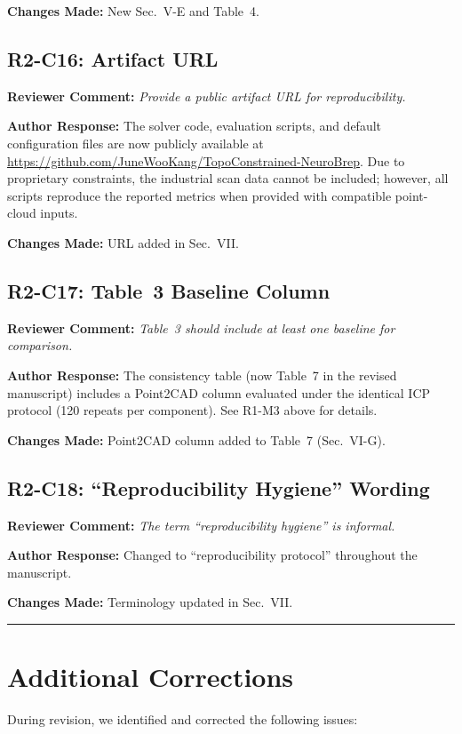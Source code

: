 \documentclass[11pt]{article}
\newcommand{\RC}[1]{\noindent\textcolor{revcolor}{\textbf{Reviewer Comment:} \emph{#1}}\par\medskip}
\newcommand{\AR}[1]{\noindent\textcolor{respcolor}{\textbf{Author Response:} #1}\par\medskip}
\newcommand{\CH}[1]{\noindent\textbf{Changes Made:} #1\par\bigskip}
\begin{document}
\CH{New Sec.~V-E and Table~4.}

\subsection*{R2-C16: Artifact URL}

\RC{Provide a public artifact URL for reproducibility.}

\AR{The solver code, evaluation scripts, and default configuration
files are now publicly available at
\url{https://github.com/JuneWooKang/TopoConstrained-NeuroBrep}.
Due to proprietary constraints, the industrial scan data cannot
be included; however, all scripts reproduce the reported metrics
when provided with compatible point-cloud inputs.}

\CH{URL added in Sec.~VII.}

\subsection*{R2-C17: Table~3 Baseline Column}

\RC{Table~3 should include at least one baseline for comparison.}

\AR{The consistency table (now Table~7 in the revised manuscript)
includes a Point2CAD column evaluated under the identical ICP
protocol (120 repeats per component).
See R1-M3 above for details.}

\CH{Point2CAD column added to Table~7 (Sec.~VI-G).}

\subsection*{R2-C18: ``Reproducibility Hygiene'' Wording}

\RC{The term ``reproducibility hygiene'' is informal.}

\AR{Changed to ``reproducibility protocol'' throughout the
manuscript.}

\CH{Terminology updated in Sec.~VII.}

\bigskip\hrule\bigskip

\section*{Additional Corrections}

During revision, we identified and corrected the following issues:
\end{document}
